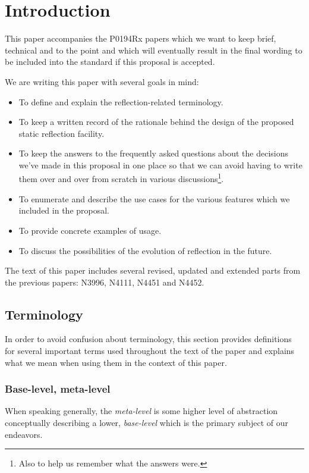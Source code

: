 \section{Introduction}

This paper accompanies the P0194Rx papers which we want to keep brief, technical
and to the point and which will eventually result in the final wording to be
included into the standard if this proposal is accepted.

We are writing this paper with several goals in mind:

\begin{itemize}
\item To define and explain the reflection-related terminology.
\item To keep a written record of the rationale behind the design of the
proposed static reflection facility.
\item To keep the answers to the frequently asked questions about
the decisions we've made in this proposal in one place so that we can avoid
having to write them over and over from scratch in various discussions\footnote
{Also to help us remember what the answers were.}.
\item To enumerate and describe the use cases for the various features
which we included in the proposal.
\item To provide concrete examples of usage.
\item To discuss the possibilities of the evolution of reflection in the future.
\end{itemize}

The text of this paper includes several revised, updated and extended parts
from the previous papers: N3996, N4111, N4451 and N4452.

\subsection{Terminology}

In order to avoid confusion about terminology, this section provides definitions
for several important terms used throughout the text of the paper and
explains what we mean when using them in the context of this paper.

\subsubsection{Base-level, meta-level}
\label{term-base-meta-level}

When speaking generally, the {\em meta-level} is some higher level of abstraction
conceptually describing a lower, {\em base-level} which is the primary subject
of our endeavors.

